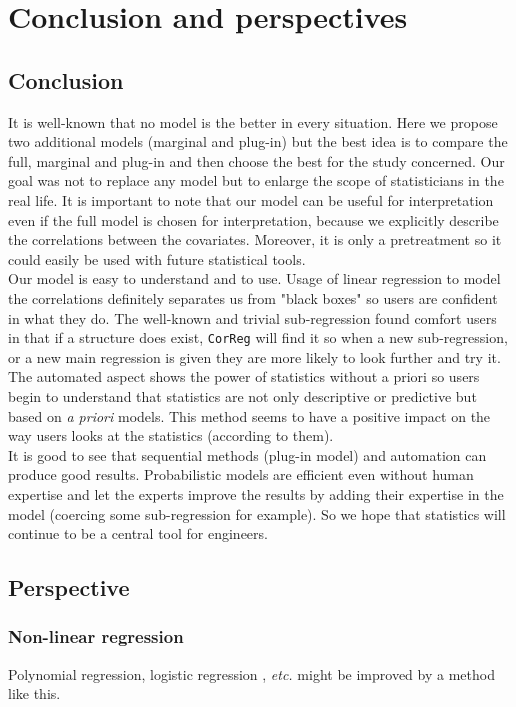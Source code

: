 \documentclass[12pt,a4paper]{report}
\begin{document}
\chapter{Conclusion and perspectives}
	\section{Conclusion}
		It is well-known that no model is the better in every situation. Here we propose two additional models (marginal and plug-in) but the best idea is to compare the full, marginal and plug-in and then choose the best for the study concerned. Our goal was not to replace any model but to enlarge the scope of statisticians in the real life. It is important to note that our model can be useful for interpretation even if the full model is chosen for interpretation, because we explicitly describe the correlations between the covariates. Moreover, it is only a pretreatment so it could easily be used with future statistical tools. \\
		Our model is easy to understand and to use. Usage of linear regression to model the correlations definitely separates us from "black boxes" so users are confident in what they do. The well-known and trivial sub-regression found comfort users in that if a structure does exist, {\tt CorReg} will find it so when a new sub-regression, or a new main regression is given they are more likely to look further and try it. The automated aspect shows the power of statistics without a priori so users begin to understand that statistics are not only descriptive or predictive but based on {\it a priori} models. This method seems to have a positive impact on the way users looks at the statistics (according to them). \\
			It is good to see that sequential methods (plug-in model) and automation can produce good results. Probabilistic models are efficient even without human expertise and let the experts improve the results by adding their expertise in the model (coercing some sub-regression for example). So we hope that statistics will continue to be a central tool for engineers.
		
		
	\section{Perspective}
		\subsection{Non-linear regression}
			Polynomial regression, logistic regression \cite{hosmer2000applied}, {\it etc.} might be improved by a method like this.
\end{document}
